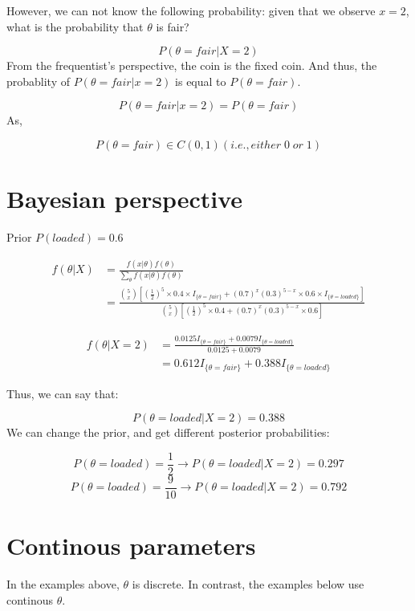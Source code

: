 \documentclass[]{book}
\begin{document}
However, we can not know the following probability: given that we observe \(x=2\), what is the probability that \(\theta\) is fair?

\[P(\theta=fair | X=2)\]
From the frequentist's perspective, the coin is the fixed coin. And thus, the probablity of \(P(\theta=fair|x=2)\) is equal to \(P(\theta=fair)\).

\[P(\theta=fair|x=2)=P(\theta=fair)\]
As,

\[P(\theta=fair) \in C(0,1) (i.e., either \; 0 \; or \; 1)\]

\hypertarget{bayesian-perspective}{%
\section{Bayesian perspective}\label{bayesian-perspective}}

Prior \(P(loaded)=0.6\)

\[\begin{aligned} f(\theta | X) &= \frac{f(x|\theta) f(\theta)}{\sum_{\theta} f(x|\theta)f(\theta)} \\ &=\frac{\binom{5}{x} [(\frac{1}{2})^5 \times 0.4 \times I_{\{\theta=fair \}}+ (0.7)^x(0.3)^{5-x} \times 0.6 \times I_{\{\theta=loaded \}}]}{\binom{5}{x} [(\frac{1}{2})^5 \times 0.4 + (0.7)^x(0.3)^{5-x} \times 0.6]}  \end{aligned}\]

\[\begin{aligned} f(\theta |X=2) &=\frac{0.0125 I_{\{\theta=fair \}}+0.0079 I_{\{\theta=loaded \}} }{0.0125+0.0079} \\ &= 0.612 I_{\{\theta=fair \}} + 0.388 I_{\{\theta=loaded \}} \end{aligned}\]

Thus, we can say that:

\[P(\theta=loaded | X=2)=0.388\]
We can change the prior, and get different posterior probabilities:

\[P(\theta=loaded)=\frac{1}{2} \rightarrow P(\theta=loaded | X=2)=0.297\]
\[P(\theta=loaded)=\frac{9}{10} \rightarrow P(\theta=loaded | X=2)=0.792\]

\hypertarget{continous-parameters}{%
\section{Continous parameters}\label{continous-parameters}}

In the examples above, \(\theta\) is discrete. In contrast, the examples below use continous \(\theta\).
\end{document}
